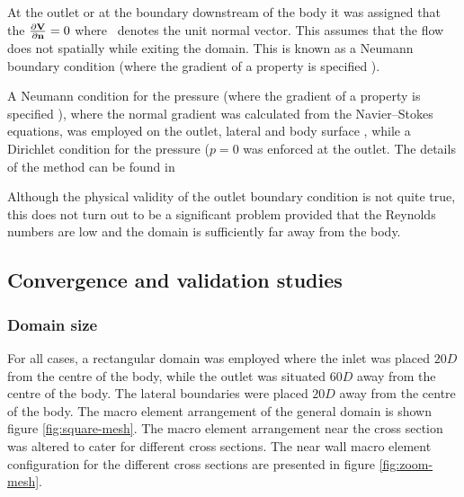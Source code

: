 At the outlet or at the boundary downstream of the body it was assigned that the $\frac{\partial\mathbf{V}}{\partial\mathbf{n}}=0$ where \normal\ denotes the unit normal vector. This assumes that the flow does not spatially while exiting the domain. This is known as a Neumann boundary condition (where the gradient of a property is specified \citet{tu2007}).




A Neumann condition for the pressure (where the gradient of a property is specified \citet{tu2007}), where the normal gradient was calculated from the Navier--Stokes equations, was employed on the outlet, lateral and body surface \citep{gresho1987}, while a Dirichlet condition for the pressure ($p=0$ was enforced at the outlet. The details of the method can be found in \citet{Thompson2006,Thompson1996a}

 Although the physical validity of the outlet boundary condition is not quite true, this does not turn out to be a significant problem provided that the Reynolds numbers are low and the domain is sufficiently far away from the body.



 
 
 
 
 
 
\subsection{Convergence and validation studies}

\subsubsection{Domain size}

 For all cases, a rectangular domain was employed where the inlet was placed $20D$ from the centre of the body, while the outlet was situated $60D$ away from the centre of the body. The lateral boundaries were placed $20D$ away from the centre of the body. The macro element arrangement of the general domain is shown figure \ref{fig:square-mesh}. The macro element arrangement near the cross section was altered to cater for different cross sections. The near wall macro element configuration for the different cross sections are presented in figure \ref{fig:zoom-mesh}. 
 
 
 
